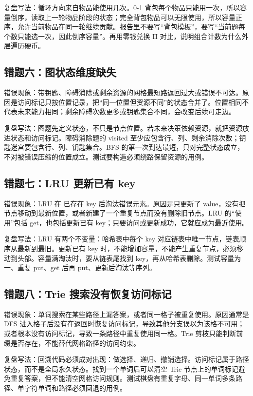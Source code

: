 复盘写法：循环方向来自物品能使用几次。0-1 背包每个物品只能用一次，所以容量倒序，读取上一轮物品阶段的状态；完全背包物品可以无限使用，所以容量正序，允许当前物品在同一轮继续贡献。报告里不要写“背包模板”，要写“当前题每个数只能选一次，因此倒序容量”。再用零钱兑换 II 对比，说明组合计数为什么外层遍历硬币。

\subsection{错题六：图状态维度缺失}

错误现象：带钥匙、障碍消除或剩余资源的网格最短路返回过大或错误不可达。原因是访问标记只按位置记录，把“同一位置但资源不同”的状态合并了。位置相同不代表未来能力相同；剩余障碍次数更多或钥匙集合不同，会改变后续可走边。

复盘写法：图题先定义状态，不只是节点位置。若未来决策依赖资源，就把资源放进状态和访问标记。障碍消除题的 visited 至少应包含行、列、剩余消除次数；钥匙迷宫要包含行、列、钥匙集合。BFS 的第一次到达最短，只对完整状态成立，不对被错误压缩的位置成立。测试要构造必须绕路保留资源的用例。

\subsection{错题七：LRU 更新已有 key}

错误现象：LRU 在  已存在 key 后淘汰错误元素。原因是只更新了 value，没有把节点移动到最新位置，或者新建了一个重复节点而没有删除旧节点。LRU 的“使用”包括 get，也包括更新已有 key；只要访问或更新成功，它就应成为最近使用。

复盘写法：LRU 有两个不变量：哈希表中每个 key 对应链表中唯一节点，链表顺序从最新到最旧。更新已有 key 时，不能增加容量，不能产生重复节点，必须移动到头部。容量满淘汰时，要从链表尾找到 key，再从哈希表删除。测试容量为一、重复 put、get 后再 put、更新后淘汰等序列。

\subsection{错题八：Trie 搜索没有恢复访问标记}

错误现象：单词搜索在某些路径上漏答案，或者同一格子被重复使用。原因通常是 DFS 进入格子后没有在返回时恢复访问标记，导致其他分支误以为该格不可用；或者根本没有访问标记，导致一条路径中重复使用同一格。Trie 剪枝只能判断前缀是否存在，不能替代网格路径的访问约束。

复盘写法：回溯代码必须成对出现：做选择、递归、撤销选择。访问标记属于路径状态，而不是全局永久状态。找到一个单词后可以清空 Trie 节点上的单词标记避免重复答案，但不能清空网格访问规则。测试棋盘有重复字母、同一单词多条路径、单字符单词和路径必须回退的用例。

